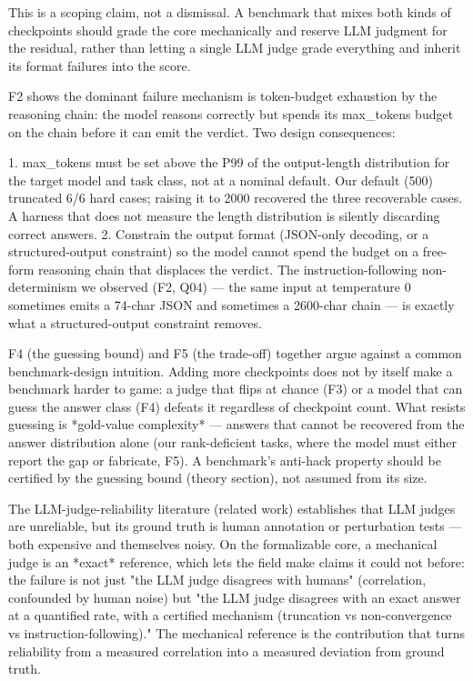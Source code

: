 \documentclass[10pt,twocolumn]{article}
\begin{document}
This is a scoping claim, not a dismissal. A benchmark that mixes both kinds of checkpoints should grade the core mechanically and reserve LLM judgment for the residual, rather than letting a single LLM judge grade everything and inherit its format failures into the score.


F2 shows the dominant failure mechanism is token-budget exhaustion by the reasoning chain: the model reasons correctly but spends its max\_tokens budget on the chain before it can emit the verdict. Two design consequences:


1. max\_tokens must be set above the P99 of the output-length distribution for the target model and task class, not at a nominal default. Our default (500) truncated 6/6 hard cases; raising it to 2000 recovered the three recoverable cases. A harness that does not measure the length distribution is silently discarding correct answers. 2. Constrain the output format (JSON-only decoding, or a structured-output constraint) so the model cannot spend the budget on a free-form reasoning chain that displaces the verdict. The instruction-following non-determinism we observed (F2, Q04) — the same input at temperature 0 sometimes emits a 74-char JSON and sometimes a 2600-char chain — is exactly what a structured-output constraint removes.


F4 (the guessing bound) and F5 (the trade-off) together argue against a common benchmark-design intuition. Adding more checkpoints does not by itself make a benchmark harder to game: a judge that flips at chance (F3) or a model that can guess the answer class (F4) defeats it regardless of checkpoint count. What resists guessing is *gold-value complexity* — answers that cannot be recovered from the answer distribution alone (our rank-deficient tasks, where the model must either report the gap or fabricate, F5). A benchmark's anti-hack property should be certified by the guessing bound (theory section), not assumed from its size.


The LLM-judge-reliability literature (related work) establishes that LLM judges are unreliable, but its ground truth is human annotation or perturbation tests — both expensive and themselves noisy. On the formalizable core, a mechanical judge is an *exact* reference, which lets the field make claims it could not before: the failure is not just "the LLM judge disagrees with humans" (correlation, confounded by human noise) but "the LLM judge disagrees with an exact answer at a quantified rate, with a certified mechanism (truncation vs non-convergence vs instruction-following)." The mechanical reference is the contribution that turns reliability from a measured correlation into a measured deviation from ground truth.
\end{document}
